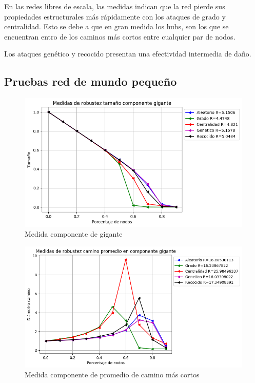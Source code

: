En las redes libres de escala, las medidas indican que la red pierde sus propiedades estructurales más rápidamente con los ataques de grado y centralidad. Esto se debe a que en gran medida los hubs, son los que se encuentran entro de los caminos más cortos entre cualquier par de nodos.

Los ataques genético y recocido presentan una efectividad intermedia de daño.


\subsection{Pruebas red de mundo pequeño}

\begin{figure}[H]
    \centering
    \includegraphics[scale=0.7]{Capitulo5Robustez/imagenes/grafica_GC20180510_143549SmallWorld5000NodesRewire01.png}
    \caption{Medida componente de gigante}
    \label{figure:smallWorldGC}
\end{figure}


\begin{figure}[H]
    \centering
    \includegraphics[scale=0.7]{Capitulo5Robustez/imagenes/grafica_APL20180510_143549SmallWorld5000NodesRewire01.png}
    \caption{Medida componente de promedio de camino más cortos}
    \label{figure:smallWorldAPL}
\end{figure}

